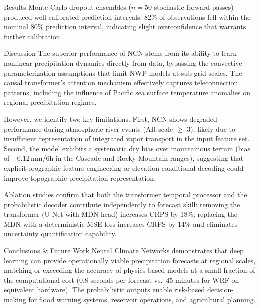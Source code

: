 \documentclass{article}
\newcommand{\sectionicon}[1]{\makebox[1.3em][l]{#1}}
\begin{document}
\begin{minipage}[t]{0.485\textwidth}
\begin{posterblock}{\sectionicon{\faChartBar} Results}
\vspace{4pt}
Monte Carlo dropout ensembles ($n=50$ stochastic forward passes) produced well-calibrated prediction intervals: 82\% of observations fell within the nominal 80\% prediction interval, indicating slight overconfidence that warrants further calibration.
\end{posterblock}

\begin{posterblock}{\sectionicon{\faComments} Discussion}
The superior performance of NCN stems from its ability to learn nonlinear precipitation dynamics directly from data, bypassing the convective parameterization assumptions that limit NWP models at sub-grid scales. The causal transformer's attention mechanism effectively captures teleconnection patterns, including the influence of Pacific sea surface temperature anomalies on regional precipitation regimes.

However, we identify two key limitations. First, NCN shows degraded performance during atmospheric river events (AR scale $\geq$ 3), likely due to insufficient representation of integrated vapor transport in the input feature set. Second, the model exhibits a systematic dry bias over mountainous terrain (bias of $-$0.12\,mm/6h in the Cascade and Rocky Mountain ranges), suggesting that explicit orographic feature engineering or elevation-conditional decoding could improve topographic precipitation representation.

Ablation studies confirm that both the transformer temporal processor and the probabilistic decoder contribute independently to forecast skill: removing the transformer (U-Net with MDN head) increases CRPS by 18\%; replacing the MDN with a deterministic MSE loss increases CRPS by 14\% and eliminates uncertainty quantification capability.
\end{posterblock}

\begin{posterblock}{\sectionicon{\faFlagCheckered} Conclusions \& Future Work}
Neural Climate Networks demonstrates that deep learning can provide operationally viable precipitation forecasts at regional scales, matching or exceeding the accuracy of physics-based models at a small fraction of the computational cost (0.8 seconds per forecast vs.\ 45 minutes for WRF on equivalent hardware). The probabilistic outputs enable risk-based decision-making for flood warning systems, reservoir operations, and agricultural planning.


\end{posterblock}
\end{minipage}
\end{document}
